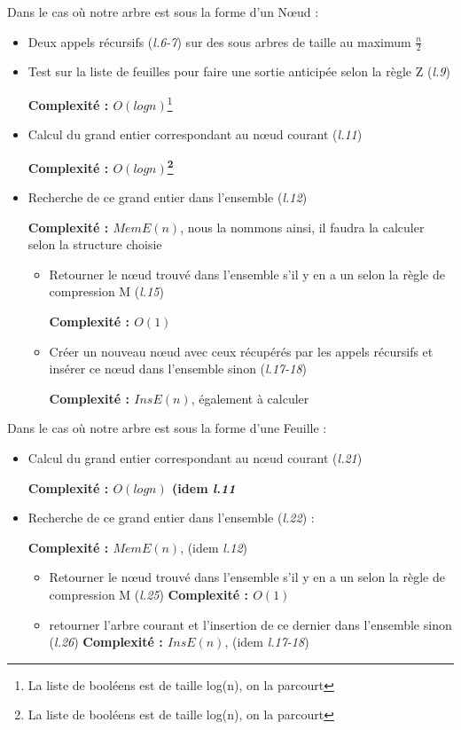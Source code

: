 \documentclass[12pt,a4paper]{article}
\begin{document}
Dans le cas où notre arbre est sous la forme d'un Nœud : 
\begin{itemize}
\item Deux appels récursifs (\textit{l.6-7}) sur des sous arbres de taille au maximum $\frac{n}{2}$
\item Test sur la liste de feuilles pour faire une sortie anticipée selon la règle Z (\textit{l.9}) 

\textbf{Complexité : $O(log n)$}\footnote{La liste de booléens est de taille log(n), on la parcourt}

\item Calcul du grand entier correspondant au nœud courant (\textit{l.11}) 

\textbf{Complexité : $O(log n)$\footnote{La liste de booléens est de taille log(n), on la parcourt}} 

\item Recherche de ce grand entier dans l'ensemble (\textit{l.12}) 

\textbf{Complexité : $MemE(n)$}, nous la nommons ainsi, il faudra la calculer selon la structure choisie

\begin{itemize}
\item Retourner le nœud trouvé dans l'ensemble s'il y en a un selon la règle de compression M (\textit{l.15}) 

\textbf{Complexité : $O(1)$}

\item Créer un nouveau nœud avec ceux récupérés par les appels récursifs et insérer ce nœud dans l'ensemble sinon (\textit{l.17-18})

\textbf{Complexité : $InsE(n)$}, également à calculer
\end{itemize}

\end{itemize}

Dans le cas où notre arbre est sous la forme d'une Feuille : 
\begin{itemize}
\item Calcul du grand entier correspondant au nœud courant (\textit{l.21})

\textbf{Complexité : $O(log n)$ (idem \textit{l.11}} 

\item Recherche de ce grand entier dans l'ensemble (\textit{l.22}) :

\textbf{Complexité : $MemE(n)$}, (idem \textit{l.12})

\begin{itemize}
\item Retourner le nœud trouvé dans l'ensemble s'il y en a un selon la règle de compression M (\textit{l.25})
\textbf{Complexité : $O(1)$}

\item retourner l'arbre courant et l'insertion de ce dernier dans l'ensemble sinon (\textit{l.26})
\textbf{Complexité : $InsE(n)$}, (idem \textit{l.17-18})

\end{itemize}

\end{itemize}
\end{document}
